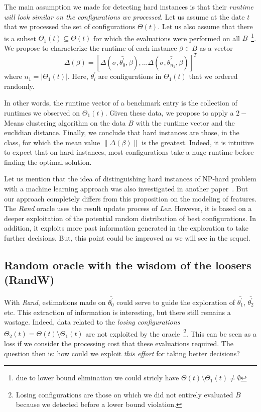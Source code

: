 \documentclass[10pt, conference, compsocconf]{IEEEtran}
\newcommand{\norm}[1]{\left\lVert#1\right\rVert}
\begin{document}
The main assumption we made for detecting hard instances is that their
{\it runtime will look similar on the configurations we processed}.
Let us assume at the date $t$ that we processed the set of
configurations $\Theta(t)$. Let us also assume that there is a subset
$\Theta_1(t) \subseteq \Theta(t)$ for which the evaluations were
performed on all $B$~\footnote{due to lower bound elimination we could
  stricly have $\Theta(t) \setminus \Theta_1(t) \neq \emptyset$}.  We
propose to characterize the runtime of each instance $\beta \in B$ as
a vector
\[ \Delta(\beta) = [\Delta(\sigma, \bar{\theta^{'}_0}, \beta), \dots
\Delta(\sigma, \bar{\theta^{'}_{n_1}}, \beta) ]^T \]
where $n_1 = |\Theta_1(t)|$. Here, $\theta^{'}_{i}$ are configurations
in $\Theta_1(t)$ that we ordered randomly.

In other words, the runtime vector of a benchmark entry is the
collection of runtimes we observed on $\Theta_1(t)$.  Given these
data, we propose to apply a $2-$Means clustering algorithm on the data
$B$ with the runtime vector and the euclidian distance. Finally, we
conclude that hard instances are those, in the class, for which the
mean value $\norm{\Delta(\beta)}$ is the greatest. Indeed, it is
intuitive to expect that on hard instances, most configurations take a
huge runtime before finding the optimal solution.

Let us mention that the idea of distinguishing hard instances of
NP-hard problem with a machine learning approach was also investigated
in another paper~\cite{WZZReport}. But our approach completely differs
from this proposition on the modeling of features.  The {\it Rand}
oracle uses the result update process of {\it Lex}. However, it is
based on a deeper exploitation of the potential random distribution of
best configurations. In addition, it exploits more past information
generated in the exploration to take further decisions. But, this
point could be improved as we will see in the sequel.

\subsection{Random oracle with the wisdom of the loosers (RandW)}

With {\it Rand}, estimations made on $\bar{\theta^{'}_0}$ could serve
to guide the exploration of $\bar{\theta^{'}_{1}}$,
$\bar{\theta^{'}_{2}}$ etc. This extraction of information is
interesting, but there still remains a wastage. Indeed, data related
to the {\it losing configurations}
$\Theta_2(t) = \Theta(t) \setminus \Theta_1(t)$ are not exploited by
the oracle~\footnote{Losing configurations are those on which we did
  not entirely evaluated $B$ because we detected before a lower bound
  violation.}.  This can be seen as a loss if we consider the
processing cost that these evaluations required. The question then is:
how could we exploit {\it this effort} for taking better decisions?
\end{document}
